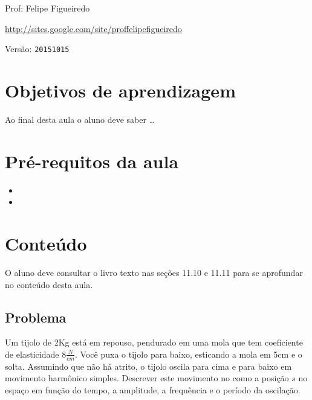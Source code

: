 \documentclass[a4paper]{article}
\begin{document}
\parbox[c]{.825\textwidth}{\raggedright%
{Prof: Felipe Figueiredo\par}
{\url{http://sites.google.com/site/proffelipefigueiredo}\par}
}

Versão: \verb|20151015|



\section{Objetivos de aprendizagem}

Ao final desta aula o aluno deve saber \ldots


\section{Pré-requitos da aula}

\begin{itemize}
\item 
\item 
\end{itemize}

\section{Conteúdo}

O aluno deve consultar o livro texto nas seções 11.10 e 11.11 para se
aprofundar no conteúdo desta aula.

\subsection{Problema}

Um tijolo de 2Kg está em repouso, pendurado em uma mola que tem
coeficiente de elasticidade 8$\frac{N}{cm}$. Você puxa o tijolo para
baixo, esticando a mola em 5cm e o solta. Assumindo que não há atrito,
o tijolo oscila para cima e para baixo em movimento harmônico
simples. Descrever este movimento no como a posição $s$ no espaço em
função do tempo, a amplitude, a frequência e o período da oscilação.
\end{document}
